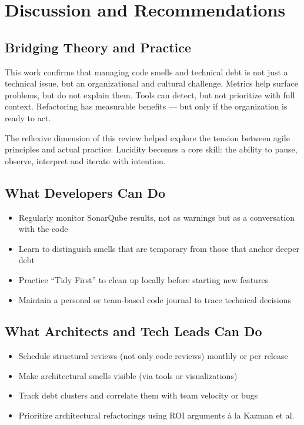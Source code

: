 
\section{Discussion and Recommendations}

\subsection{Bridging Theory and Practice}

This work confirms that managing code smells and technical debt is not just a technical issue, but an organizational and cultural challenge. Metrics help surface problems, but do not explain them. Tools can detect, but not prioritize with full context. Refactoring has measurable benefits — but only if the organization is ready to act.

The reflexive dimension of this review helped explore the tension between agile principles and actual practice. Lucidity becomes a core skill: the ability to pause, observe, interpret and iterate with intention.

\subsection{What Developers Can Do}

\begin{itemize}
    \item Regularly monitor SonarQube results, not as warnings but as a conversation with the code
    \item Learn to distinguish smells that are temporary from those that anchor deeper debt
    \item Practice ``Tidy First'' to clean up locally before starting new features
    \item Maintain a personal or team-based code journal to trace technical decisions
\end{itemize}

\subsection{What Architects and Tech Leads Can Do}

\begin{itemize}
    \item Schedule structural reviews (not only code reviews) monthly or per release
    \item Make architectural smells visible (via tools or visualizations)
    \item Track debt clusters and correlate them with team velocity or bugs
    \item Prioritize architectural refactorings using ROI arguments à la Kazman et al.
\end{itemize}

